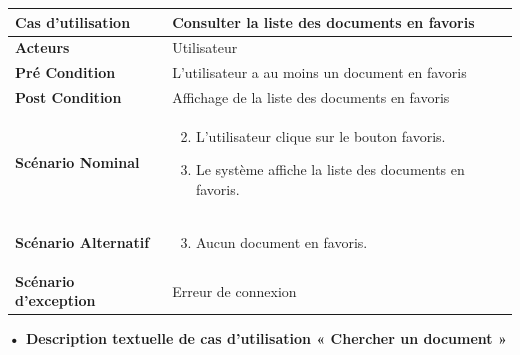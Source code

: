\begin{longtable}{|p{5cm}|p{10cm}|}
\hline
\textbf{Cas d'utilisation}&Consulter la liste des documents en favoris\\
\hline
\textbf{Acteurs}&Utilisateur\\
\hline
\textbf{Pré Condition}&L'utilisateur a au moins un document en favoris\\
\hline
\textbf{Post Condition}&Affichage de la liste des documents en favoris\\
\hline
\textbf{Scénario Nominal}&
\vspace{-\baselineskip}
\begin{enumerate}
    \setcounter{enumi}{1}
    \item L'utilisateur clique sur le bouton favoris.
    \item Le système affiche la liste des documents en favoris.
\end{enumerate}\\
\hline
\textbf{Scénario Alternatif}&
\vspace{-\baselineskip}
\begin{enumerate}
    \setcounter{enumi}{2}
    \item Aucun document en favoris.
\end{enumerate}\\
\hline
\textbf{Scénario d'exception}&Erreur de connexion\\
\hline
\end{longtable}




\textbf{•	Description textuelle de cas d'utilisation « Chercher un document »}

